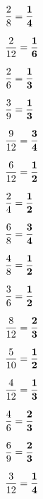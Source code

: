 \documentclass[a4paper, 11pt]{ltjsarticle}
\begin{document}
 \twocolumn[


 \vspace*{5ex} ]

 \begin{enumerate}
 
{\Large \item  $\displaystyle \frac{2}{8}={\bf \frac{1}{4}} $} \vfill
{\Large \item  $\displaystyle \frac{2}{12}={\bf \frac{1}{6}} $} \vfill
{\Large \item  $\displaystyle \frac{2}{6}={\bf \frac{1}{3}} $} \vfill
{\Large \item  $\displaystyle \frac{3}{9}={\bf \frac{1}{3}} $} \vfill
{\Large \item  $\displaystyle \frac{9}{12}={\bf \frac{3}{4}} $} \vfill
{\Large \item  $\displaystyle \frac{6}{12}={\bf \frac{1}{2}} $} \vfill
{\Large \item  $\displaystyle \frac{2}{4}={\bf \frac{1}{2}} $} \vfill
{\Large \item  $\displaystyle \frac{6}{8}={\bf \frac{3}{4}} $} \vfill

\newpage
 
{\Large \item  $\displaystyle \frac{4}{8}={\bf \frac{1}{2}} $} \vfill
{\Large \item  $\displaystyle \frac{3}{6}={\bf \frac{1}{2}} $} \vfill
{\Large \item  $\displaystyle \frac{8}{12}={\bf \frac{2}{3}} $} \vfill
{\Large \item  $\displaystyle \frac{5}{10}={\bf \frac{1}{2}} $} \vfill
{\Large \item  $\displaystyle \frac{4}{12}={\bf \frac{1}{3}} $} \vfill
{\Large \item  $\displaystyle \frac{4}{6}={\bf \frac{2}{3}} $} \vfill
{\Large \item  $\displaystyle \frac{6}{9}={\bf \frac{2}{3}} $} \vfill
{\Large \item  $\displaystyle \frac{3}{12}={\bf \frac{1}{4}} $} \vfill

  \end{enumerate}
  
\end{document}
